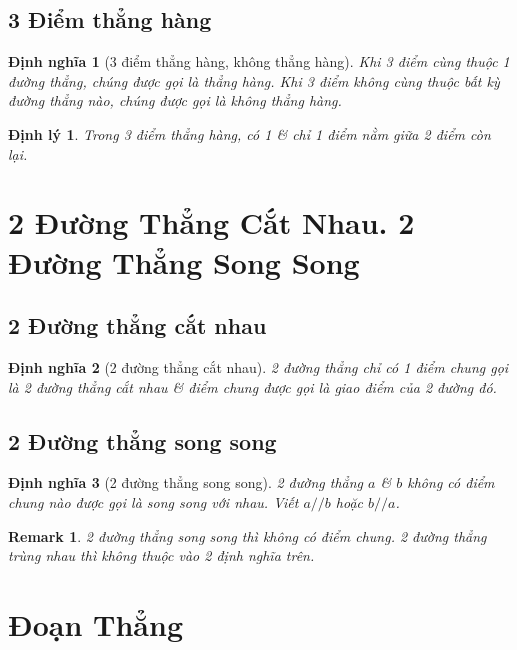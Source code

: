 \documentclass[oneside]{book}
\numberwithin{equation}{section}
\newtheorem{dinhnghia}{Định nghĩa}[section]
\newtheorem{remark}{Remark}[section]
\newtheorem{dinhly}{Định lý}[section]
\begin{document}
\subsection{3 Điểm thẳng hàng}

\begin{dinhnghia}[3 điểm thẳng hàng, không thẳng hàng]
	Khi 3 điểm cùng thuộc 1 đường thẳng, chúng được gọi là \emph{thẳng hàng}. Khi 3 điểm không cùng thuộc bất kỳ đường thẳng nào, chúng được gọi là \emph{không thẳng hàng}.
\end{dinhnghia}

\begin{dinhly}
	Trong 3 điểm thẳng hàng, có 1 \textit{\&} chỉ 1 điểm nằm giữa 2 điểm còn lại.
\end{dinhly}

\section{2 Đường Thẳng Cắt Nhau. 2 Đường Thẳng Song Song}

\subsection{2 Đường thẳng cắt nhau}

\begin{dinhnghia}[2 đường thẳng cắt nhau]
	2 đường thẳng chỉ có 1 điểm chung gọi là \emph{2 đường thẳng cắt nhau} \textit{\&} điểm chung được gọi là \emph{giao điểm} của 2 đường đó.
\end{dinhnghia}

\subsection{2 Đường thẳng song song}

\begin{dinhnghia}[2 đường thẳng song song]
	2 đường thẳng $a$ \textit{\&} $b$ không có điểm chung nào được gọi là \emph{song song với nhau}. Viết $a//b$ hoặc $b//a$.
\end{dinhnghia}

\begin{remark}
	2 đường thẳng song song thì không có điểm chung. 2 đường thẳng \emph{trùng nhau} thì không thuộc vào 2 định nghĩa trên.
\end{remark}

\section{Đoạn Thẳng}
\end{document}
